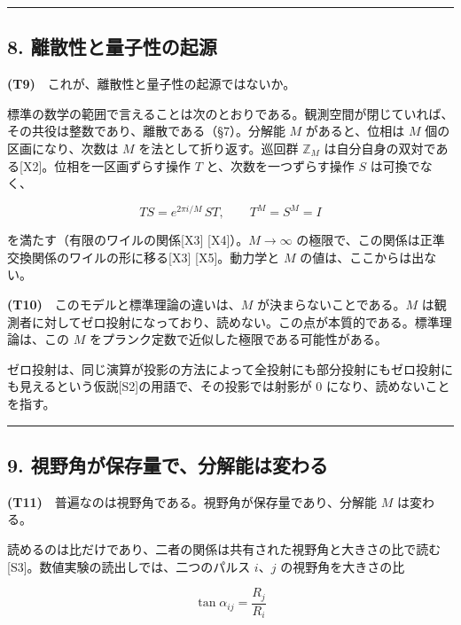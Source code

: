 \documentclass[
  a4paper,
]{ltjsarticle}
\begin{document}
\begin{center}\rule{0.5\linewidth}{0.5pt}\end{center}

\subsection{8.
離散性と量子性の起源}\label{ux96e2ux6563ux6027ux3068ux91cfux5b50ux6027ux306eux8d77ux6e90}

\textbf{(T9)}　これが、離散性と量子性の起源ではないか。

標準の数学の範囲で言えることは次のとおりである。観測空間が閉じていれば、その共役は整数であり、離散である（§7）。分解能
\(M\) があると、位相は \(M\) 個の区画になり、次数は \(M\)
を法として折り返す。巡回群 \(\mathbb{Z}_M\)
は自分自身の双対である{[}X2{]}。位相を一区画ずらす操作 \(T\)
と、次数を一つずらす操作 \(S\) は可換でなく、

\[
TS=e^{2\pi i/M}\,ST,\qquad T^{M}=S^{M}=I
\]

を満たす（有限のワイルの関係{[}X3{]} {[}X4{]}）。\(M\to\infty\)
の極限で、この関係は正準交換関係のワイルの形に移る{[}X3{]}
{[}X5{]}。動力学と \(M\) の値は、ここからは出ない。

\textbf{(T10)}　このモデルと標準理論の違いは、\(M\)
が決まらないことである。\(M\)
は観測者に対してゼロ投射になっており、読めない。この点が本質的である。標準理論は、この
\(M\) をプランク定数で近似した極限である可能性がある。

ゼロ投射は、同じ演算が投影の方法によって全投射にも部分投射にもゼロ投射にも見えるという仮説{[}S2{]}の用語で、その投影では射影が
0 になり、読めないことを指す。

\begin{center}\rule{0.5\linewidth}{0.5pt}\end{center}

\subsection{9.
視野角が保存量で、分解能は変わる}\label{ux8996ux91ceux89d2ux304cux4fddux5b58ux91cfux3067ux5206ux89e3ux80fdux306fux5909ux308fux308b}

\textbf{(T11)}　普遍なのは視野角である。視野角が保存量であり、分解能
\(M\) は変わる。

読めるのは比だけであり、二者の関係は共有された視野角と大きさの比で読む{[}S3{]}。数値実験の読出しでは、二つのパルス
\(i\)、\(j\) の視野角を大きさの比

\[
\tan\alpha_{ij}=\frac{R_j}{R_i}
\]
\end{document}
